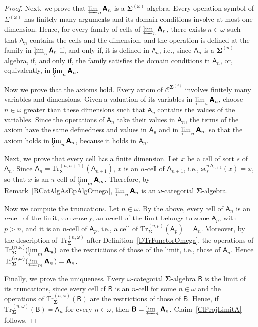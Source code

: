 \documentclass[a4paper, reqno]{amsbook}
\newcommand{\sig}[1]{\mathbf{#1}}             %
\newcommand{\calg}[1]{\boldsymbol{\mathsf{#1}}} %
\newcommand{\spec}[1]{\boldsymbol{\mathcal{#1}}} %
\newcommand{\src}{\mathrm{sc}}
\newcommand{\Tr}{\mathrm{Tr}}
\theoremstyle{plain}
\theoremstyle{definition}
\begin{document}
\begin{proof}
Next, we prove that $\varprojlim_{n}\calg{A}_{n}$ is a $\sig{\Sigma}^{(\omega)}$-algebra.
Every operation symbol of $\Sigma^{(\omega)}$ has finitely many arguments and its domain conditions involve at most one dimension.
Hence, for every family of cells of $\varprojlim_{n}\calg{A}_{n}$, there exists $n\in\omega$ such that $\calg{A}_{n}$ contains the cells and the dimension, and the operation is defined at the family in $\varprojlim_{n}\calg{A}_{n}$ if, and only if, it is defined in $\calg{A}_{n}$, i.e., since $\calg{A}_{n}$ is a $\sig{\Sigma}^{(n)}$-algebra, if, and only if, the family satisfies the domain conditions in $\calg{A}_{n}$, or, equivalently, in $\varprojlim_{n}\calg{A}_{n}$.

Now we prove that the axioms hold.
Every axiom of $\spec{C}^{\sig{\Sigma}^{(\omega)}}$ involves finitely many variables and dimensions.
Given a valuation of its variables in $\varprojlim_{n}\calg{A}_{n}$, choose $n\in\omega$ greater than these dimensions such that $\calg{A}_{n}$ contains the values of the variables.
Since the operations of $\calg{A}_{n}$ take their values in $\calg{A}_{n}$, the terms of the axiom have the same definedness and values in $\calg{A}_{n}$ and in $\varprojlim_{n}\calg{A}_{n}$, so that the axiom holds in $\varprojlim_{n}\calg{A}_{n}$, because it holds in $\calg{A}_{n}$.

Next, we prove that every cell has a finite dimension.
Let $x$ be a cell of sort $s$ of $\calg{A}_{n}$.
Since $\calg{A}_{n}=\Tr^{(n,n+1)}_{\sig{\Sigma}}(\calg{A}_{n+1})$, $x$ is an $n$-cell of $\calg{A}_{n+1}$, i.e., $\src^{n\,\calg{A}_{n+1}}_{s}(x)=x$, so that $x$ is an $n$-cell of $\varprojlim_{m}\calg{A}_{m}$.
Therefore, by Remark~\ref{RCatAlgAsEpAlgOmega}, $\varprojlim_{n}\calg{A}_{n}$ is an $\omega$-categorial $\sig{\Sigma}$-algebra.

Now we compute the truncations.
Let $n\in\omega$.
By the above, every cell of $\calg{A}_{n}$ is an $n$-cell of the limit; conversely, an $n$-cell of the limit belongs to some $\calg{A}_{p}$, with $p>n$, and it is an $n$-cell of $\calg{A}_{p}$, i.e., a cell of $\Tr^{(n,p)}_{\sig{\Sigma}}(\calg{A}_{p})=\calg{A}_{n}$.
Moreover, by the description of $\Tr^{(n,\omega)}_{\sig{\Sigma}}$ after Definition~\ref{DTrFunctorOmega}, the operations of $\Tr^{(n,\omega)}_{\sig{\Sigma}}(\varprojlim_{m}\calg{A}_{m})$ are the restrictions of those of the limit, i.e., those of $\calg{A}_{n}$.
Hence $\Tr^{(n,\omega)}_{\sig{\Sigma}}(\varprojlim_{m}\calg{A}_{m})=\calg{A}_{n}$.

Finally, we prove the uniqueness.
Every $\omega$-categorial $\sig{\Sigma}$-algebra $\calg{B}$ is the limit of its truncations, since every cell of $\calg{B}$ is an $n$-cell for some $n\in\omega$ and the operations of $\Tr^{(n,\omega)}_{\sig{\Sigma}}(\calg{B})$ are the restrictions of those of $\calg{B}$.
Hence, if $\Tr^{(n,\omega)}_{\sig{\Sigma}}(\calg{B})=\calg{A}_{n}$ for every $n\in\omega$, then $\calg{B}=\varprojlim_{n}\calg{A}_{n}$.
Claim~\ref{ClProjLimitA} follows.


\end{proof}
\end{document}
